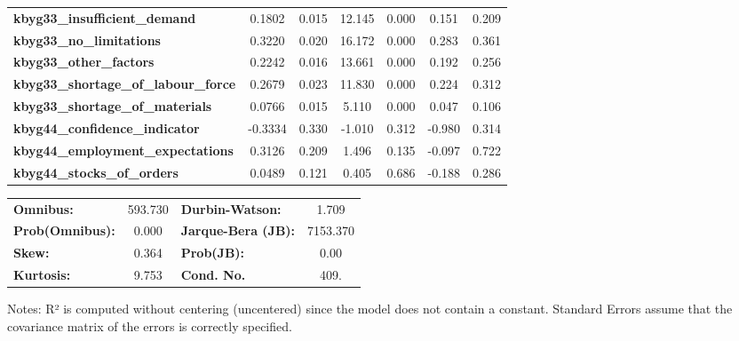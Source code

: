 \begin{center}
\begin{tabular}{lcccccc}
\textbf{kbyg33\_insufficient\_demand}        &       0.1802  &        0.015     &    12.145  &         0.000        &        0.151    &        0.209     \\
\textbf{kbyg33\_no\_limitations}             &       0.3220  &        0.020     &    16.172  &         0.000        &        0.283    &        0.361     \\
\textbf{kbyg33\_other\_factors}              &       0.2242  &        0.016     &    13.661  &         0.000        &        0.192    &        0.256     \\
\textbf{kbyg33\_shortage\_of\_labour\_force} &       0.2679  &        0.023     &    11.830  &         0.000        &        0.224    &        0.312     \\
\textbf{kbyg33\_shortage\_of\_materials}     &       0.0766  &        0.015     &     5.110  &         0.000        &        0.047    &        0.106     \\
\textbf{kbyg44\_confidence\_indicator}       &      -0.3334  &        0.330     &    -1.010  &         0.312        &       -0.980    &        0.314     \\
\textbf{kbyg44\_employment\_expectations}    &       0.3126  &        0.209     &     1.496  &         0.135        &       -0.097    &        0.722     \\
\textbf{kbyg44\_stocks\_of\_orders}          &       0.0489  &        0.121     &     0.405  &         0.686        &       -0.188    &        0.286     \\
\bottomrule
\end{tabular}
\begin{tabular}{lclc}
\textbf{Omnibus:}       & 593.730 & \textbf{  Durbin-Watson:     } &    1.709  \\
\textbf{Prob(Omnibus):} &   0.000 & \textbf{  Jarque-Bera (JB):  } & 7153.370  \\
\textbf{Skew:}          &   0.364 & \textbf{  Prob(JB):          } &     0.00  \\
\textbf{Kurtosis:}      &   9.753 & \textbf{  Cond. No.          } &     409.  \\
\bottomrule
\end{tabular}
\end{center}

Notes: \newline
 [1] R² is computed without centering (uncentered) since the model does not contain a constant. \newline
 [2] Standard Errors assume that the covariance matrix of the errors is correctly specified.